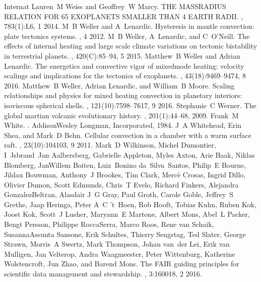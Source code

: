 \documentclass[letterpaper,10pt,english]{jupyterBook}
\begin{document}
\begin{sphinxthebibliography}{Internat}
\sphinxAtStartPar
Lauren M Weiss and Geoffrey W Marcy. THE MASS\sphinxhyphen{}RADIUS RELATION FOR 65 EXOPLANETS SMALLER THAN 4 EARTH RADII. , 783(1):L6, 1 2014.
\sphinxAtStartPar
M B Weller and A Lenardic. Hysteresis in mantle convection: plate tectonics systems. , 4 2012.
\sphinxAtStartPar
M B Weller, A Lenardic, and C O'Neill. The effects of internal heating and large scale climate variations on tectonic bi\sphinxhyphen{}stability in terrestrial planets. , 420(C):85–94, 5 2015.
\sphinxAtStartPar
Matthew B Weller and Adrian Lenardic. The energetics and convective vigor of mixed\sphinxhyphen{}mode heating: velocity scalings and implications for the tectonics of exoplanets. , 43(18):9469–9474, 8 2016.
\sphinxAtStartPar
Matthew B Weller, Adrian Lenardic, and William B Moore. Scaling relationships and physics for mixed heating convection in planetary interiors: isoviscous spherical shells. , 121(10):7598–7617, 9 2016.
\sphinxAtStartPar
Stephanie C Werner. The global martian volcanic evolutionary history. , 201(1):44–68, 2009.
\sphinxAtStartPar
Frank M White. . Addison\sphinxhyphen{}Wesley Longman, Incorporated, 1984.
\sphinxAtStartPar
J A Whitehead, Erin Shea, and Mark D Behn. Cellular convection in a chamber with a warm surface raft. , 23(10):104103, 9 2011.
\sphinxAtStartPar
Mark D Wilkinson, Michel Dumontier, I Jsbrand Jan Aalbersberg, Gabrielle Appleton, Myles Axton, Arie Baak, Niklas Blomberg, Jan\sphinxhyphen{}Willem Boiten, Luiz Bonino da Silva Santos, Philip E Bourne, Jildau Bouwman, Anthony J Brookes, Tim Clark, Mercè Crosas, Ingrid Dillo, Olivier Dumon, Scott Edmunds, Chris T Evelo, Richard Finkers, Alejandra Gonzalez\sphinxhyphen{}Beltran, Alasdair J G Gray, Paul Groth, Carole Goble, Jeffrey S Grethe, Jaap Heringa, Peter A C 't Hoen, Rob Hooft, Tobias Kuhn, Ruben Kok, Joost Kok, Scott J Lusher, Maryann E Martone, Albert Mons, Abel L Packer, Bengt Persson, Philippe Rocca\sphinxhyphen{}Serra, Marco Roos, Rene van Schaik, Susanna\sphinxhyphen{}Assunta Sansone, Erik Schultes, Thierry Sengstag, Ted Slater, George Strawn, Morris A Swertz, Mark Thompson, Johan van der Lei, Erik van Mulligen, Jan Velterop, Andra Waagmeester, Peter Wittenburg, Katherine Wolstencroft, Jun Zhao, and Barend Mons. The FAIR guiding principles for scientific data management and stewardship. , 3:160018, 2 2016.

\end{sphinxthebibliography}
\end{document}
